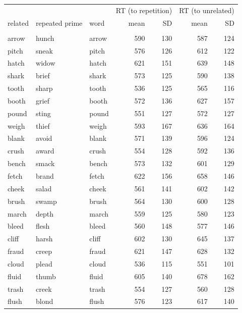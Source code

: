 \documentclass[
]{interact}
\begin{document}
\begin{table}
\fontsize{12.0pt}{14.4pt}\selectfont
\begin{tabular*}{\linewidth}{@{\extracolsep{\fill}}lllrrrr}
\toprule
 &  &  & \multicolumn{2}{c}{RT (to repetition)} & \multicolumn{2}{c}{RT (to unrelated)} \\ 
\cmidrule(lr){4-5} \cmidrule(lr){6-7}
related & repeated prime & word & mean & SD & mean & SD \\ 
\midrule\addlinespace[2.5pt]
\multicolumn{7}{l}{\emph{low frequency condition}} \\[2.5pt] 
\midrule\addlinespace[2.5pt]
arrow & hunch & arrow & 590 & 130 & 587 & 124 \\ 
pitch & sneak & pitch & 576 & 126 & 612 & 122 \\ 
hatch & widow & hatch & 621 & 151 & 639 & 148 \\ 
shark & brief & shark & 573 & 125 & 590 & 138 \\ 
tooth & sharp & tooth & 536 & 125 & 565 & 116 \\ 
booth & grief & booth & 572 & 136 & 627 & 157 \\ 
pound & sting & pound & 551 & 127 & 572 & 127 \\ 
weigh & thief & weigh & 593 & 167 & 636 & 164 \\ 
blank & avoid & blank & 571 & 139 & 596 & 124 \\ 
crush & award & crush & 554 & 128 & 592 & 136 \\ 
bench & smack & bench & 573 & 132 & 601 & 129 \\ 
fetch & brand & fetch & 622 & 156 & 658 & 146 \\ 
cheek & salad & cheek & 561 & 141 & 602 & 142 \\ 
brush & swamp & brush & 564 & 130 & 600 & 128 \\ 
march & depth & march & 559 & 125 & 580 & 123 \\ 
bleed & flesh & bleed & 560 & 148 & 577 & 146 \\ 
cliff & harsh & cliff & 602 & 130 & 645 & 137 \\ 
fraud & creep & fraud & 621 & 147 & 628 & 132 \\ 
cloud & plead & cloud & 536 & 115 & 551 & 101 \\ 
fluid & thumb & fluid & 605 & 140 & 678 & 162 \\ 
trash & creek & trash & 554 & 127 & 560 & 128 \\ 
flush & blond & flush & 576 & 123 & 617 & 140 \\ 

\end{tabular*}
\end{table}
\end{document}

